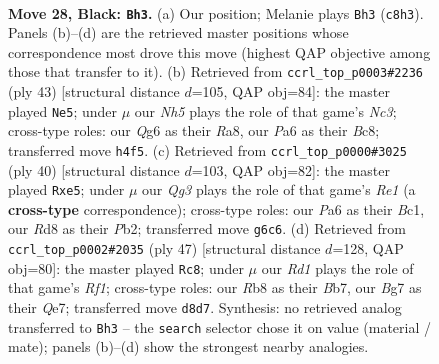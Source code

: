 \documentclass[11pt]{article}
\begin{document}
\clearpage

\begin{figure}[p]\centering
\begin{subfigure}{0.46\textwidth}\centering
\resizebox{\linewidth}{!}{%
\newchessgame
\chessboard[
  setfen={nrbr2k1/5pb1/p5qp/2Q1p3/1p2P2n/3P1P2/PP1B2B1/RN2NRK1 b - - 0 28},
  showmover=false,
  pgfstyle=straightmove, color=movearrow, markmove={c8-h3}
]}
\caption{}
\end{subfigure}\hfill
\begin{subfigure}{0.46\textwidth}\centering
\resizebox{\linewidth}{!}{%
\newchessgame
\chessboard[
  setfen={r1b2rk1/1p4b1/2np1qpp/PNn5/2PNp3/4B2P/2Q1BPP1/R4RK1 b - - 1 22},
  showmover=false,
  pgfstyle=straightmove, color=movearrow, markmove={c6-e5}
]}
\caption{}
\end{subfigure}
\\[4pt]
\begin{subfigure}{0.46\textwidth}\centering
\resizebox{\linewidth}{!}{%
\newchessgame
\chessboard[
  setfen={r3r1k1/pb3pp1/2pq1n1p/1p2b3/8/P2B1N2/1PQ2PPP/R1B1R1K1 w - - 2 21},
  showmover=false,
  pgfstyle=straightmove, color=movearrow, markmove={e1-e5}
]}
\caption{}
\end{subfigure}\hfill
\begin{subfigure}{0.46\textwidth}\centering
\resizebox{\linewidth}{!}{%
\newchessgame
\chessboard[
  setfen={5rk1/1b2qpp1/p2br2p/3p3Q/1P1Bn3/P4N1P/2B2PP1/2R1R1K1 b - - 8 24},
  showmover=false,
  pgfstyle=straightmove, color=movearrow, markmove={f8-c8}
]}
\caption{}
\end{subfigure}
\caption{\textbf{Move 28, Black: \texttt{Bh3}.} (a) Our position; Melanie plays \texttt{Bh3} (\texttt{c8h3}). Panels (b)--(d) are the retrieved master positions whose correspondence most drove this move (highest QAP objective among those that transfer to it). (b) Retrieved from \texttt{ccrl\_top\_p0003\#2236} (ply 43) [structural distance $d$=105, QAP obj=84]: the master played \texttt{Ne5}; under $\mu$ our \emph{Nh5} plays the role of that game's \emph{Nc3}; cross-type roles: our \emph{Q}g6 as their \emph{R}a8, our \emph{P}a6 as their \emph{B}c8; transferred move \texttt{h4f5}. (c) Retrieved from \texttt{ccrl\_top\_p0000\#3025} (ply 40) [structural distance $d$=103, QAP obj=82]: the master played \texttt{Rxe5}; under $\mu$ our \emph{Qg3} plays the role of that game's \emph{Re1} (a \textbf{cross-type} correspondence); cross-type roles: our \emph{P}a6 as their \emph{B}c1, our \emph{R}d8 as their \emph{P}b2; transferred move \texttt{g6c6}. (d) Retrieved from \texttt{ccrl\_top\_p0002\#2035} (ply 47) [structural distance $d$=128, QAP obj=80]: the master played \texttt{Rc8}; under $\mu$ our \emph{Rd1} plays the role of that game's \emph{Rf1}; cross-type roles: our \emph{R}b8 as their \emph{B}b7, our \emph{B}g7 as their \emph{Q}e7; transferred move \texttt{d8d7}. Synthesis: no retrieved analog transferred to \texttt{Bh3} -- the \texttt{search} selector chose it on value (material / mate); panels (b)--(d) show the strongest nearby analogies.}
\label{fig:thought-m55}
\end{figure}
\end{document}
